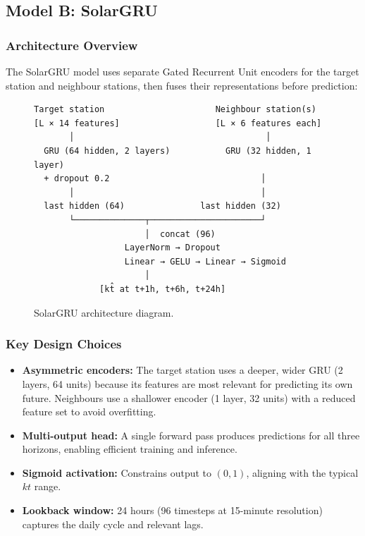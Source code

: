 \documentclass[11pt,a4paper]{article}
\begin{document}
\subsection{Model B: SolarGRU}

\subsubsection{Architecture Overview}

The SolarGRU model uses separate Gated Recurrent Unit encoders for the target station and neighbour stations, then fuses their representations before prediction:

\begin{figure}[H]
\centering
\begin{verbatim}
Target station                      Neighbour station(s)
[L × 14 features]                   [L × 6 features each]
       │                                      │
  GRU (64 hidden, 2 layers)           GRU (32 hidden, 1 layer)
  + dropout 0.2                              │
       │                                     │
  last hidden (64)               last hidden (32)
       └──────────────┬──────────────────────┘
                      │  concat (96)
                  LayerNorm → Dropout
                  Linear → GELU → Linear → Sigmoid
                      │
             [kt̂ at t+1h, t+6h, t+24h]
\end{verbatim}
\caption{SolarGRU architecture diagram.}
\label{fig:gru_arch}
\end{figure}

\subsubsection{Key Design Choices}

\begin{itemize}[noitemsep]
    \item \textbf{Asymmetric encoders:} The target station uses a deeper, wider GRU (2 layers, 64 units) because its features are most relevant for predicting its own future. Neighbours use a shallower encoder (1 layer, 32 units) with a reduced feature set to avoid overfitting.
    \item \textbf{Multi-output head:} A single forward pass produces predictions for all three horizons, enabling efficient training and inference.
    \item \textbf{Sigmoid activation:} Constrains output to $(0, 1)$, aligning with the typical $kt$ range.
    \item \textbf{Lookback window:} 24 hours (96 timesteps at 15-minute resolution) captures the daily cycle and relevant lags.
\end{itemize}
\end{document}
